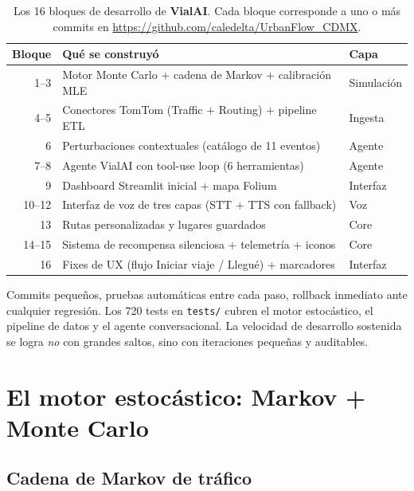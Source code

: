 \documentclass[11pt,a4paper]{article}
\newcommand{\VialAI}{\textbf{\textcolor{vialTeal}{Vial}\textcolor{vialAmber}{AI}}}
\begin{document}
\begin{table}[H]
\centering
\small
\renewcommand{\arraystretch}{1.4}
\begin{tabularx}{\linewidth}{@{}r X l@{}}
\toprule
\rowcolor{vialNavy!10}
\textbf{Bloque} & \textbf{Qué se construyó} & \textbf{Capa} \\
\midrule
1--3  & Motor Monte Carlo + cadena de Markov + calibración MLE & Simulación \\
4--5  & Conectores TomTom (Traffic + Routing) + pipeline ETL & Ingesta \\
6     & Perturbaciones contextuales (catálogo de 11 eventos) & Agente \\
7--8  & Agente VialAI con tool-use loop (6 herramientas) & Agente \\
9     & Dashboard Streamlit inicial + mapa Folium & Interfaz \\
10--12 & Interfaz de voz de tres capas (STT + TTS con fallback) & Voz \\
13    & Rutas personalizadas y lugares guardados & Core \\
14--15 & Sistema de recompensa silenciosa + telemetría + iconos & Core \\
16    & Fixes de UX (flujo Iniciar viaje / Llegué) + marcadores & Interfaz \\
\bottomrule
\end{tabularx}
\caption{Los 16 bloques de desarrollo de \VialAI. Cada bloque corresponde a uno
         o más commits en \url{https://github.com/caledelta/UrbanFlow_CDMX}.}
\label{tab:bloques}
\end{table}

\begin{tipbox}
Commits pequeños, pruebas automáticas entre cada paso, rollback
inmediato ante cualquier regresión. Los \num{720} tests en
\texttt{tests/} cubren el motor estocástico, el pipeline de datos
y el agente conversacional. La velocidad de desarrollo sostenida
se logra \emph{no} con grandes saltos, sino con iteraciones pequeñas
y auditables.
\end{tipbox}

\section{El motor estocástico: Markov + Monte Carlo}

\subsection{Cadena de Markov de tráfico}
\end{document}
